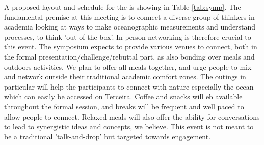 A proposed layout and schedule for the \symp is showing in Table
\ref{tab:symp}. The fundamental premise at this meeting is to connect a
diverse group of thinkers in academia looking at ways to make
oceanographic measurements and understand processes, to think 'out of
the box'. In-person networking is therefore crucial to this event. The
symposium expects to provide various venues to connect, both in the
formal presentation/challenge/rebuttal part, as also bonding over meals
and outdoors activities. We plan to offer all meals together, and urge
people to mix and network outside their traditional academic comfort
zones. The outings in particular will help the participants to connect
with nature especially the ocean which can easily be accessed on
Terceira. Coffee and snacks will eb available throughout the formal
session, and breaks will be frequent and well paced to allow people to
connect. Relaxed meals will also offer the ability for conversations to
lead to synergistic ideas and concepts, we believe. This event is not
meant to be a traditional 'talk-and-drop' but targeted towards
engagement. 
